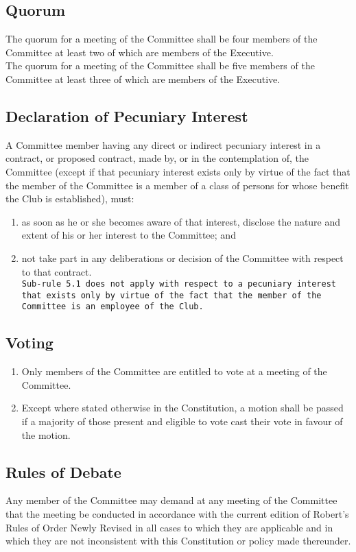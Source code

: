 \documentclass[11pt]{article} %
\begin{document}
\subsection{Quorum}
{\color{red} The quorum for a meeting of the Committee shall be four members of the Committee at least two of which are members of the Executive.}\\
{\color{ForestGreen} The quorum for a meeting of the Committee shall be five members of the Committee at least three of which are members of the Executive.}

\subsection{Declaration of Pecuniary Interest}
A Committee member having any direct or indirect pecuniary interest in a contract, or proposed contract, made by, or in the contemplation of, the Committee (except if that pecuniary interest exists only by virtue of the fact that the member of the Committee is a member of a class of persons for whose benefit the Club is established), must:
\begin{enumerate}
	\item as soon as he or she becomes aware of that interest, disclose the nature and extent of his or her interest to the Committee; and
	\item not take part in any deliberations or decision of the Committee with respect to that contract.\\
\texttt{Sub-rule 5.1 does not apply with respect to a pecuniary interest that exists only by virtue of the fact that the member of the Committee is an employee of the Club.}
\end{enumerate}

\subsection{Voting}
\begin{enumerate}
	\item Only members of the Committee are entitled to vote at a meeting of the Committee.
	\item Except where stated otherwise in the Constitution, a motion shall be passed if a majority of those present and eligible to vote cast their vote in favour of the motion.
\end{enumerate}

\subsection{Rules of Debate}
Any member of the Committee may demand at any meeting of the Committee that the meeting be conducted in accordance with the current edition of Robert’s Rules of Order Newly Revised in all cases to which they are applicable and in which they are not inconsistent with this Constitution or policy made thereunder.
\end{document}
